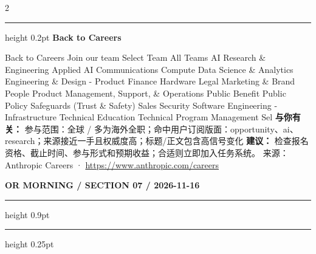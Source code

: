 \documentclass[10.5pt]{ctexart}
\begin{document}
\begin{multicols}{2}
\vspace{2mm}
\hrule height 0.2pt
\vspace{2mm}
{\large\bfseries Back to Careers}\par
Back to Careers Join our team Select Team All Teams AI Research \& Engineering Applied AI Communications Compute Data Science \& Analytics Engineering \& Design - Product Finance Hardware Legal Marketing \& Brand People Product Management, Support, \& Operations Public Benefit Public Policy Safeguards (Trust \& Safety) Sales Security Software Engineering - Infrastructure Technical Education Technical Program Management Sel
\textbf{与你有关：} 参与范围：全球 / 多为海外全职；命中用户订阅版面：opportunity、ai、research；来源接近一手且权威度高；标题/正文包含高信号变化
\textbf{建议：} 检查报名资格、截止时间、参与形式和预期收益；合适则立即加入任务系统。
{\footnotesize\color{ormuted} 来源：Anthropic Careers · \url{https://www.anthropic.com/careers}}
\end{multicols}
\newpage
{\small\bfseries OR MORNING / SECTION 07 / 2026-11-16}
\vspace{2mm}
\hrule height 0.9pt
\vspace{1.5mm}
\hrule height 0.25pt
\vspace{4mm}
\end{document}
